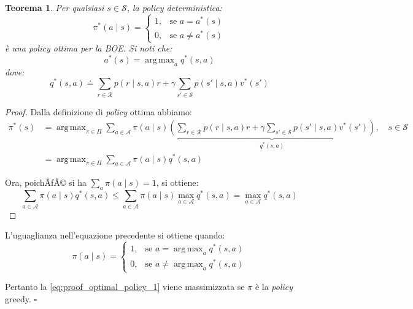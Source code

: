 ﻿\documentclass[11pt, a4paper]{report}
\newtheorem{theorem}{Teorema}
\DeclareMathOperator*{\argmax}{arg\,max}
\begin{document}
\begin{theorem}
Per qualsiasi $s \in \mathcal{S}$, la \emph{policy} deterministica:
\begin{equation}
\pi^*(a \mid s) = \begin{cases} 1, & \text{se } a = a^*(s) \\ 0, & \text{se } a \ne a^*(s) \end{cases}
\end{equation}
è una \emph{policy} ottima per la BOE. Si noti che:
\begin{equation}
a^*(s) = \argmax_{a} q^*(s, a)
\end{equation}
dove:
\begin{equation}
q^*(s, a) \doteq \sum_{r \in \mathcal{R}} p(r \mid s, a)r + \gamma \sum_{s' \in \mathcal{S}} p(s' \mid s, a)v^*(s')
\end{equation}
\end{theorem}

\begin{proof}
Dalla definizione di \emph{policy} ottima abbiamo:
\begin{align}
\pi^*(s) &= \argmax_{\pi \in \Pi} \sum_{a \in \mathcal{A}} \pi(a \mid s) \underbrace{\left( \sum_{r \in \mathcal{R}} p(r \mid s, a)r + \gamma \sum_{s' \in \mathcal{S}} p(s' \mid s, a)v^*(s') \right)}_{q^*(s, a)}, \quad s \in \mathcal{S} \nonumber \\
&= \argmax_{\pi \in \Pi} \sum_{a \in \mathcal{A}} \pi(a \mid s) q^*(s, a)
\end{align}

Ora, poichÃƒÂ© si ha $\sum_{a} \pi(a \mid s) = 1$, si ottiene:
\begin{equation}
\sum_{a \in \mathcal{A}} \pi(a \mid s) q^*(s, a) \le \sum_{a \in \mathcal{A}} \pi(a \mid s) \max_{a \in \mathcal{A}} q^*(s, a) = \max_{a \in \mathcal{A}} q^*(s, a)
\end{equation}
\end{proof}

\newpage

L'uguaglianza nell'equazione precedente si ottiene quando:
\begin{equation}
\pi(a \mid s) = \begin{cases} 1, & \text{se } a = \argmax_a q^*(s, a) \\ 0, & \text{se } a \ne \argmax_a q^*(s, a) \end{cases}
\end{equation}

Pertanto la \eqref{eq:proof_optimal_policy_1} viene massimizzata se $\pi$ è la \emph{policy} greedy. $\square$
\end{document}
